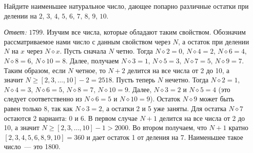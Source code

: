 Найдите наименьшее натуральное число, дающее попарно различные остатки при
делении на $2$, $3$, $4$, $5$, $6$, $7$, $8$, $9$, $10$.

\solution
\emph{Ответ:} $1799$.
\label{solution:2012/pers-algbr/junior/1}%
\begingroup\let\div\diamond
Изучим все числа, которые обладают таким свойством.
Обозначим рассматриваемое нами число с данным свойством через $N$, а остаток
при делении $N$ на $x$ через $N \div x$.
Пусть сначала $N$ четно.
Тогда $N \div 2 = 0$, $N \div 4 = 2$, $N \div 6 = 4$, $N \div 8 = 6$,
$N \div 10 = 8$.
Далее, получаем $N \div 3 = 1$, $N \div 5 = 3$, $N \div 7 = 5$, $N \div 9 = 7$.
Таким образом, если $N$ четное, то $N + 2$ делится на все числа от 2 до 10,
а значит $N \geq [2, 3, \ldots, 10] - 2 = 2518$.
Пусть теперь $N$ нечетно.
Тогда $N \div 2 = 1$, $N \div 4 = 3$, $N \div 6 = 5$, $N \div 8 = 7$,
$N \div 10 = 9$.
Далее, $N \div 3 = 2$ и $N \div 5 = 4$
(это следует соответственно из $N \div 6 = 5$ и $N \div 10 = 9$).
Остаток $N \div 9$ может быть равен только 8, так как $N \div 3 = 2$, а остатки
2 и 5 уже заняты.
Для остатка $N \div 7$ остаются 2 варианта: 0 и 6.
В первом случае $N + 1$ делится на все числа от 2 до 10, а значит
$N \geq [2, 3, \ldots, 10] - 1 > 2000$.
Во втором получаем, что $N + 1$ кратно $[2, 3, 4, 5, 6, 8, 9, 10] = 360$ и дает
остаток 1 от деления на 7.
Наименьшее такое число~--- это 1800.
\endgroup

